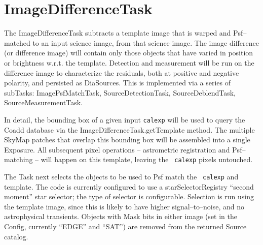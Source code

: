 \documentclass[12pt]{article}
\begin{document}
\clearpage 
\section{ImageDifferenceTask \label{sec-imagedifftask}} 



The ImageDifferenceTask subtracts a template image that is
warped and Psf--matched to an input science image, from that science image.  The
image difference (or difference image) will contain only those objects
that have varied in position or brightness w.r.t. the template.
Detection and measurement will be run on the difference image to
characterize the residuals, both at positive and negative polarity,
and persisted as DiaSources.  This is implemented via a series of
subTasks: ImagePsfMatchTask, SourceDetectionTask, SourceDeblendTask,
SourceMeasurementTask.

In detail, the bounding box of a given input {\tt calexp} will be used
to query the Coadd database via the ImageDifferenceTask.getTemplate
method.  The multiple SkyMap patches that overlap this bounding box
will be assembled into a single Exposure.  All
subsequent pixel operations -- astrometric registration and
Psf--matching -- will happen on this template, leaving the {\tt
  calexp} pixels untouched.  

The Task next selects the objects to be used to Psf match the {\tt
  calexp} and template.  The code is currently configured to use a
starSelectorRegistry ``second moment'' star selector; the type of selector is configurable.  
Selection is run using the template image,
since this is likely to have higher signal--to--noise, and no
astrophysical transients.  Objects with Mask
bits in either image (set in the Config, currently ``EDGE'' and
``SAT'') are removed from the returned Source catalog.
\end{document}
